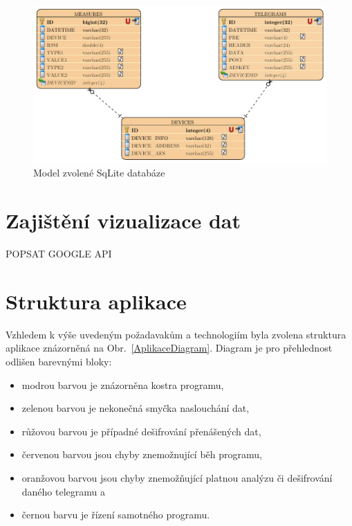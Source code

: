 \begin{figure}[!ht]
  \begin{center}
    \includegraphics[scale=0.55]{obrazky/aplikace_databaze}
  \end{center}
	\vspace{-10pt}
  \caption{Model zvolené SqLite databáze}
	\label{databazovy_model}
	\vspace{-30pt}
\end{figure}
	
\section{Zajištění vizualizace dat}	
\colorbox[rgb]{1,0,0}{POPSAT GOOGLE API}

\section{Struktura aplikace}
Vzhledem k výše uvedeným požadavakům a technologiím byla zvolena struktura aplikace znázorněná na Obr.~\ref{AplikaceDiagram}. Diagram je pro přehlednost odlišen barevnými bloky:
\begin{itemize}
	\item modrou barvou je znázorněna kostra programu,
	\item zelenou barvou je nekonečná smyčka naslouchání dat,
	\item růžovou barvou je případné dešifrování přenášených dat,
	\item červenou barvou jsou chyby znemožnující běh programu,
	\item oranžovou barvou jsou chyby znemožňující platnou analýzu či dešifrování daného telegramu a
	\item černou barvu je řízení samotného programu.
\end{itemize}

